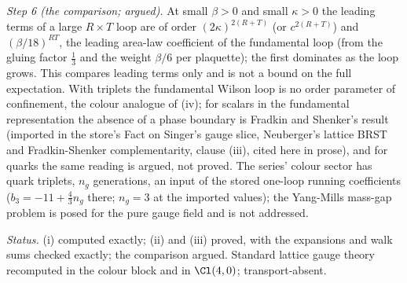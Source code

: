 \emph{Step 6 (the comparison; argued).} At small $\beta > 0$ and small $\kappa > 0$ the leading terms of a large $R \times T$ loop are of order $(2\kappa)^{2(R + T)}$ (or $c^{2(R + T)}$) and $(\beta/18)^{RT}$, the leading area-law coefficient of the fundamental loop (from the gluing factor $\tfrac13$ and the weight $\beta/6$ per plaquette); the first dominates as the loop grows. This compares leading terms only and is not a bound on the full expectation. With triplets the fundamental Wilson loop is no order parameter of confinement, the colour analogue of (iv); for scalars in the fundamental representation the absence of a phase boundary is Fradkin and Shenker's result (imported in the store's Fact on Singer's gauge slice, Neuberger's lattice BRST and Fradkin-Shenker complementarity, clause (iii), cited here in prose), and for quarks the same reading is argued, not proved. The series' colour sector has quark triplets, $n_{g}$ generations, an input of the stored one-loop running coefficients ($b_{3} = -11 + \tfrac43n_{g}$ there; $n_{g} = 3$ at the imported values); the Yang-Mills mass-gap problem is posed for the pure gauge field and is not addressed.

\emph{Status.} (i) computed exactly; (ii) and (iii) proved, with the expansions and walk sums checked exactly; the comparison argued. Standard lattice gauge theory recomputed in the colour block and in $\Cl(4,0)$; transport-absent.

